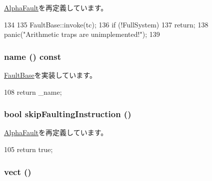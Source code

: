 \hyperlink{classAlphaISA_1_1AlphaFault_a2bd783b42262278d41157d428e1f8d6f}{AlphaFault}を再定義しています。


\begin{DoxyCode}
134 {
135     FaultBase::invoke(tc);
136     if (!FullSystem)
137         return;
138     panic("Arithmetic traps are unimplemented!");
139 }
\end{DoxyCode}
\hypertarget{classAlphaISA_1_1ArithmeticFault_a73adb23259baf912a81683a9790a303f}{
\subsubsection[{name}]{ name () const}}
\label{classAlphaISA_1_1ArithmeticFault_a73adb23259baf912a81683a9790a303f}


\hyperlink{classFaultBase_aad960357563b8b969d2dffdcc6861de7}{FaultBase}を実装しています。


\begin{DoxyCode}
108 {return _name;}
\end{DoxyCode}
\hypertarget{classAlphaISA_1_1ArithmeticFault_a4dca22d2e3f19609672fe85bb5e28b56}{
\subsubsection[{skipFaultingInstruction}]{\setlength{\rightskip}{0pt plus 5cm}bool skipFaultingInstruction ()}}
\label{classAlphaISA_1_1ArithmeticFault_a4dca22d2e3f19609672fe85bb5e28b56}


\hyperlink{classAlphaISA_1_1AlphaFault_a5d44c6b9ce6041b3e9235e8d978156cb}{AlphaFault}を再定義しています。


\begin{DoxyCode}
105 {return true;}
\end{DoxyCode}
\hypertarget{classAlphaISA_1_1ArithmeticFault_ae15c5d7ab0162821b93d668d0b225198}{
\subsubsection[{vect}]{ vect ()}}
\label{classAlphaISA_1_1ArithmeticFault_ae15c5d7ab0162821b93d668d0b225198}


